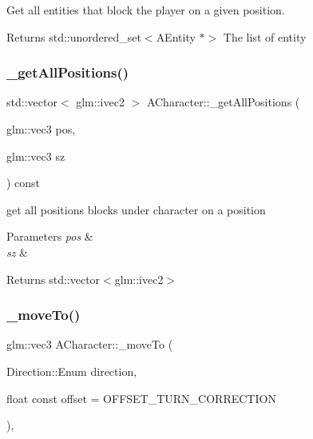 Get all entities that block the player on a given position. 

\begin{DoxyReturn}{Returns}
std\+::unordered\+\_\+set$<$\+A\+Entity $\ast$$>$ The list of entity 
\end{DoxyReturn}
\mbox{\label{class_a_character_ac90c6aeec198c760cba165860a67f622}} 
\subsubsection{\texorpdfstring{\+\_\+get\+All\+Positions()}{\_getAllPositions()}}
{\footnotesize\ttfamily std\+::vector$<$ glm\+::ivec2 $>$ A\+Character\+::\+\_\+get\+All\+Positions (\begin{DoxyParamCaption}\item[{glm\+::vec3}]{pos,  }\item[{glm\+::vec3}]{sz }\end{DoxyParamCaption}) const\hspace{0.3cm}{\ttfamily [protected]}}



get all positions blocks under character on a position 


\begin{DoxyParams}{Parameters}
{\em pos} & \\
\hline
{\em sz} & \\
\hline
\end{DoxyParams}
\begin{DoxyReturn}{Returns}
std\+::vector$<$glm\+::ivec2$>$ 
\end{DoxyReturn}
\mbox{\label{class_a_character_a4785e1688ede03fe488bfdfd3d2339ee}} 
\subsubsection{\texorpdfstring{\+\_\+move\+To()}{\_moveTo()}\hspace{0.1cm}{\footnotesize\ttfamily [1/2]}}
{\footnotesize\ttfamily glm\+::vec3 A\+Character\+::\+\_\+move\+To (\begin{DoxyParamCaption}\item[{Direction\+::\+Enum}]{direction,  }\item[{float const}]{offset = {\ttfamily OFFSET\+\_\+TURN\+\_\+CORRECTION} }\end{DoxyParamCaption})\hspace{0.3cm}{\ttfamily [protected]}, {\ttfamily [virtual]}}



